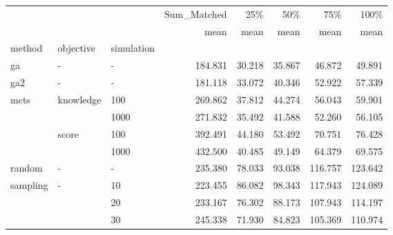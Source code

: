 \begin{tabular}{lllrrrrr}
\toprule
         &   &    & Sum\_Matched &    25\% &    50\% &     75\% &    100\% \\
         &   &    &        mean &   mean &   mean &    mean &    mean \\
method & objective & simulation &             &        &        &         &         \\
\midrule
ga & - & - &     184.831 & 30.218 & 35.867 &  46.872 &  49.891 \\
ga2 & - & - &     181.118 & 33.072 & 40.346 &  52.922 &  57.339 \\
mcts & knowledge & 100 &     269.862 & 37.812 & 44.274 &  56.043 &  59.901 \\
         &   & 1000 &     271.832 & 35.492 & 41.588 &  52.260 &  56.105 \\
         & score & 100 &     392.491 & 44.180 & 53.492 &  70.751 &  76.428 \\
         &   & 1000 &     432.500 & 40.485 & 49.149 &  64.379 &  69.575 \\
random & - & - &     235.380 & 78.033 & 93.038 & 116.757 & 123.642 \\
sampling & - & 10 &     223.455 & 86.082 & 98.343 & 117.943 & 124.089 \\
         &   & 20 &     233.167 & 76.302 & 88.173 & 107.943 & 114.197 \\
         &   & 30 &     245.338 & 71.930 & 84.823 & 105.369 & 110.974 \\
\bottomrule
\end{tabular}

